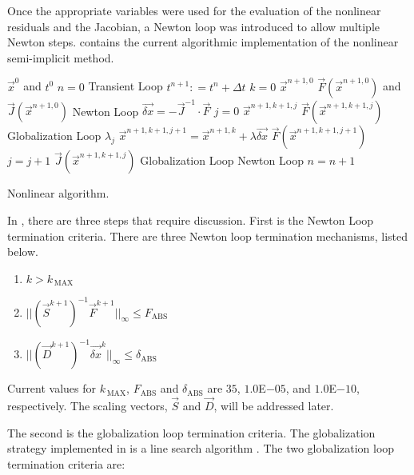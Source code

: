 Once the appropriate variables were used for the evaluation of the nonlinear residuals and the Jacobian, a Newton loop was introduced to allow multiple Newton steps.
 contains the current algorithmic implementation of the nonlinear semi-implicit method.

\begin{algo}[H]
\setlength{\baselineskip}{0.625\baselineskip}
\begin{algorithmic}[1]
\Require $\vec{x}^{0}$ and $t^{0}$
\Set $n = 0$
\Loop \; Transient Loop
    \State $t^{n+1} : = t^{n} + \Delta t$
    \State $k = 0$
    \Define $\vec{x}^{n+1,0}$
	\Calculate $\vec{F}(\vec{x}^{n+1,0})$ and $\vec{J}(\vec{x}^{n+1,0})$
    \Loop \; Newton Loop
		\Calculate $\vec{\delta x} = - \vec{J}^{-1}\cdot\vec{F}$
		$j = 0$		
		\Calculate $\vec{x}^{n+1,k+1,j}$
		\Calculate $\vec{F}(\vec{x}^{n+1,k+1,j})$
		\Loop \; Globalization Loop
				\Calculate $\lambda_j$
				\Calculate $\vec{x}^{n+1,k+1,j+1} = \vec{x}^{n+1,k} + \lambda \vec{\delta x}$
				\Calculate $\vec{F}(\vec{x}^{n+1,k+1,j+1})$
				\State $j = j + 1$			
			\Else
				\Calculate $\vec{J}(\vec{x}^{n+1,k+1,j})$
				\Exit Globalization Loop
			\EndIf
		\EndLoop			
			\Exit Newton Loop
		\EndIf
	\EndLoop
	\State $n = n + 1$
\EndLoop
\end{algorithmic}
\caption{Nonlinear \cobra{} algorithm.}
\label{alg:nl_cobra}
\end{algo}

In , there are three steps that require discussion.
First is the Newton Loop termination criteria.
There are three Newton loop termination mechanisms, listed below.

\begin{enumerate}
\item{$k > k_{\,\text{MAX}}$}
\item{$||(\vec{S}^{k+1})^{-1}\vec{F}^{k+1}||_{\infty} \leq F_{\text{ABS}}$}
\item{$||(\vec{D}^{k+1})^{-1}\vec{\delta x}^{k}||_{\infty} \leq \delta_{\text{ABS}}$}
\end{enumerate}

Current values for $k_{\,\text{MAX}}$, $F_{\text{ABS}}$ and $\delta_{\text{ABS}}$ are $35$, $1.0$E$-05$, and $1.0$E$-10$, respectively.
The scaling vectors, $\vec{S}$ and $\vec{D}$, will be addressed later.

The second is the globalization loop termination criteria.
The globalization strategy implemented in \cobra{} is a line search algorithm \cite{Dennis1996}.
The two globalization loop termination criteria are:


